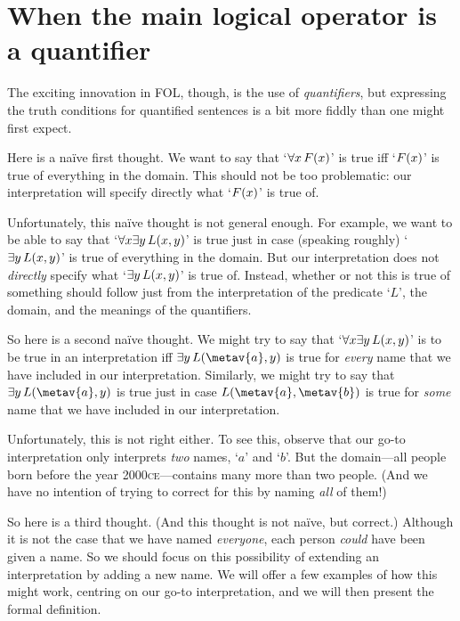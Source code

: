 \section[Quantifiers]{When the main logical operator is a quantifier}\label{s:MainLogicalOperatorQuantifier}
The exciting innovation in FOL, though, is the use of \emph{quantifiers}, but expressing the truth conditions for quantified sentences is a bit more fiddly than one might first expect. 

Here is a na\"{i}ve first thought. We want to say that `$\forall x\, \mathord{F}(x)$' is true iff `$\mathord{F}(x)$' is true of everything in the domain. This should not be too problematic: our interpretation will specify directly what `$\mathord{F}(x)$' is true of. 

Unfortunately, this na\"{i}ve thought is not general enough. For example, we want to be able to say that `$\forall x \exists y\, \mathord{L}(x,y)$' is true just in case (speaking roughly) `$\exists y\, \mathord{L}(x,y)$' is true of everything in the domain. But our interpretation does not \emph{directly} specify what `$\exists y\, \mathord{L}(x,y)$' is true of. Instead, whether or not this is true of something should follow just from the interpretation of the predicate `$L$', the domain, and the meanings of the quantifiers. 

So here is a second na\"{i}ve thought. We might try to say that `$\forall x \exists y\, \mathord{L}(x,y)$' is to be true in an interpretation iff $\exists y\, \atom{L}{\metav{a},y}$ is true for \emph{every} name  that we have included in our interpretation. Similarly, we might try to say that $\exists y\, \atom{L}{\metav{a},y}$ is true just in case $\atom{L}{\metav{a},\metav{b}}$ is true for \emph{some} name  that we have included in our interpretation.

Unfortunately, this is not right either. To see this, observe that our go-to interpretation only interprets \emph{two} names, `$a$' and `$b$'. But the domain---all people born before the year 2000\textsc{ce}---contains many more than two people. (And we have no intention of trying to correct for this by naming \emph{all} of them!)

So here is a third thought. (And this thought is not na\"{i}ve, but correct.) Although it is not the case that we have named \emph{everyone}, each person \emph{could} have been given a name. So we should focus on this possibility of extending an interpretation by adding a new name. We will offer a few examples of how this might work, centring on our go-to interpretation, and we will then present the formal definition. 

